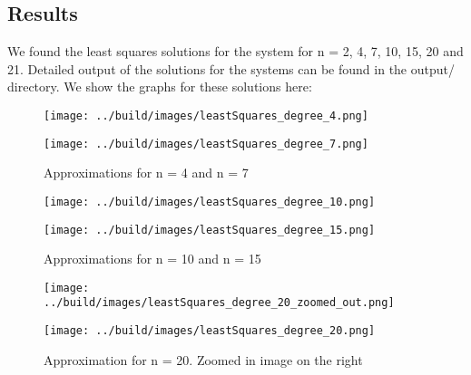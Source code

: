\documentclass[11pt, a4paper, titlepage, openright]{article}
\begin{document}
\subsection{Results}
    We found the least squares solutions for the system for n = 2, 4, 7, 10, 15, 20 and 21. Detailed output of the solutions for the systems can be found in the output/ directory.
    We show the graphs for these solutions here:
    \begin{figure}[H]
        \begin{minipage}[b]{0.49\textwidth}
            \texttt{[image: ../build/images/leastSquares\_degree\_4.png]}
        \end{minipage}
        \hfill
        \begin{minipage}[b]{0.49\textwidth}
            \texttt{[image: ../build/images/leastSquares\_degree\_7.png]}
        \end{minipage}
        \caption{Approximations for n = 4 and n = 7}
        \label{fig:results1}
    \end{figure}
    \begin{figure}[H]
        \begin{minipage}[b]{0.49\textwidth}
            \texttt{[image: ../build/images/leastSquares\_degree\_10.png]}
        \end{minipage}
        \hfill
        \begin{minipage}[b]{0.49\textwidth}
            \texttt{[image: ../build/images/leastSquares\_degree\_15.png]}
        \end{minipage}
       \caption{Approximations for n = 10 and n = 15}
        \label{fig:results2}
    \end{figure}
    \begin{figure}[H]
        \begin{minipage}[b]{0.49\textwidth}
            \texttt{[image: ../build/images/leastSquares\_degree\_20\_zoomed\_out.png]}
        \end{minipage}
        \hfill
        \begin{minipage}[b]{0.49\textwidth}
            \texttt{[image: ../build/images/leastSquares\_degree\_20.png]}
        \end{minipage}
        \caption{Approximation for n = 20. Zoomed in image on the right}
        \label{fig:results3}
    \end{figure}
\end{document}
